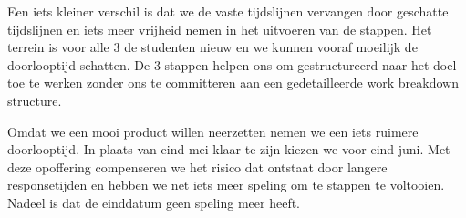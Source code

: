 \begin{description}
\begin{aanpassing1}
Een iets kleiner verschil is dat we de vaste tijdslijnen vervangen door geschatte tijdslijnen en 
iets meer vrijheid nemen in het uitvoeren van de stappen. Het terrein is voor alle 3 de studenten 
nieuw en we kunnen vooraf moeilijk de doorlooptijd schatten. De 3 stappen helpen ons om gestructureerd 
naar het doel toe te werken zonder ons te committeren aan een gedetailleerde work breakdown structure.

Omdat we een mooi product willen neerzetten nemen we een iets ruimere doorlooptijd. In plaats van 
eind mei klaar te zijn kiezen we voor eind juni. Met deze opoffering compenseren we het risico
dat ontstaat door langere responsetijden en hebben we net iets meer speling om te stappen te voltooien.
Nadeel is dat de einddatum geen speling meer heeft.
\end{aanpassing1}

\end{description}